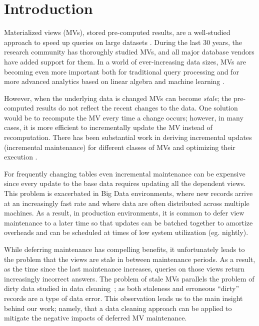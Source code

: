 \vspace{-0.5em}
\section{Introduction}
Materialized views (MVs), stored pre-computed results, are a well-studied approach to speed up queries on large datasets \cite{LarsonY85, gupta1995maintenance, chirkova2011materialized, halevy2001answering}.
During the last 30 years, the research community has thoroughly studied MVs, and all major database vendors have added support for them.
In a world of ever-increasing data sizes, MVs are becoming even more important both for traditional query processing and for more advanced analytics based on linear algebra and machine learning \cite{nikolic2014linview, zhang2014mat}.

However, when the underlying data is changed MVs can become \emph{stale}; the pre-computed results do not reflect the recent changes to the data. 
One solution would be to recompute the MV every time a change occurs; however, in many cases, it is more efficient to incrementally update the MV instead of recomputation.
There has been substantial work in deriving incremental updates (incremental maintenance) for different classes of MVs and optimizing their execution \cite{chirkova2011materialized}.

For frequently changing tables even incremental maintenance can be expensive since every update to the base data requires updating all the dependent views.  
This problem is exacerbated in Big Data environments, where new records arrive at an increasingly fast rate and where data are often 
distributed across multiple machines.  
As a result, in production environments, it is common to defer view maintenance to a later time \cite{chirkova2011materialized, zhou2007lazy, DBLP:conf/sigmod/ColbyGLMT96} so that updates can be batched together to amortize overheads and can be scheduled at times of low system utilization (eg. nightly).  

While deferring maintenance has compelling benefits, it unfortunately leads to the problem that the views are stale in between maintenance periods. 
As a result, as the time since the last maintenance increases, queries on those views return increasingly incorrect answers.
The problem of stale MVs parallels the problem of dirty data studied in data cleaning~\cite{rahm2000data}; as both staleness and erroneous ``dirty'' records are a type of data error.
This observation leads us to the main insight behind our work; namely, that a data cleaning approach can be applied to mitigate the negative impacts of deferred MV maintenance.

